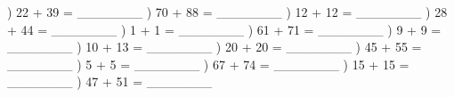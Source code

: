 \documentclass{article}%
\begin{document}
\newline%
) 22 + 39 = \_\_\_\_\_\_\_%
\newline%
\newline%
) 70 + 88 = \_\_\_\_\_\_\_%
\newline%
\newline%
) 12 + 12 = \_\_\_\_\_\_\_%
\newline%
\newline%
) 28 + 44 = \_\_\_\_\_\_\_%
\newline%
\newline%
) 1 + 1 = \_\_\_\_\_\_\_%
\newline%
\newline%
) 61 + 71 = \_\_\_\_\_\_\_%
\newline%
\newline%
) 9 + 9 = \_\_\_\_\_\_\_%
\newline%
\newline%
) 10 + 13 = \_\_\_\_\_\_\_%
\newline%
\newline%
) 20 + 20 = \_\_\_\_\_\_\_%
\newline%
\newline%
) 45 + 55 = \_\_\_\_\_\_\_%
\newline%
\newline%
) 5 + 5 = \_\_\_\_\_\_\_%
\newline%
\newline%
) 67 + 74 = \_\_\_\_\_\_\_%
\newline%
\newline%
) 15 + 15 = \_\_\_\_\_\_\_%
\newline%
\newline%
) 47 + 51 = \_\_\_\_\_\_\_%
\newline%
\newline%
\newline%
\end{document}
